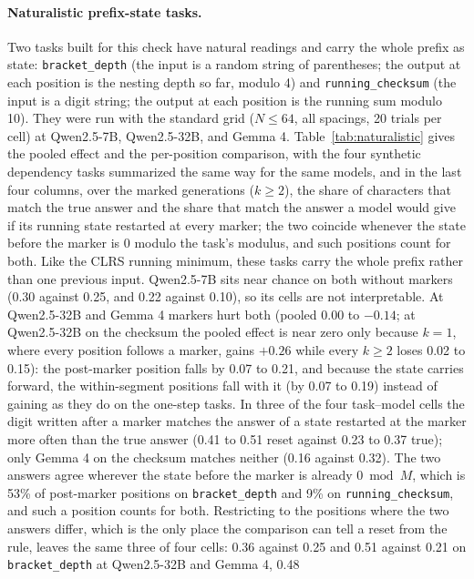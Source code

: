 \documentclass[10pt]{article} %
\newcommand{\task}[1]{\texttt{#1}}
\begin{document}
\begin{table}[!htbp]
\centering
\small
\caption{Gemini 3.6 Flash: prompt tokens added per added input character, from the API's token counts, by input format and marker spacing $k$, at the step from $N = 32$ to $N = 64$, with each marker counted as one token (exact in the spaced, digit, and binary formats, where the count at spacing $k$ exceeds the no-marker count by the number of markers at every $N$). A value of 1.00 is one token per character.}
\label{tab:geminitokens}

\end{table}

\paragraph{Naturalistic prefix-state tasks.} Two tasks built for this check have natural readings and carry the whole prefix as state: \task{bracket\_depth} (the input is a random string of parentheses; the output at each position is the nesting depth so far, modulo 4) and \task{running\_checksum} (the input is a digit string; the output at each position is the running sum modulo 10). They were run with the standard grid ($N \le 64$, all spacings, 20 trials per cell) at Qwen2.5-7B, Qwen2.5-32B, and Gemma 4. Table~\ref{tab:naturalistic} gives the pooled effect and the per-position comparison, with the four synthetic dependency tasks summarized the same way for the same models, and in the last four columns, over the marked generations ($k \ge 2$), the share of characters that match the true answer and the share that match the answer a model would give if its running state restarted at every marker; the two coincide whenever the state before the marker is 0 modulo the task's modulus, and such positions count for both. Like the CLRS running minimum, these tasks carry the whole prefix rather than one previous input. Qwen2.5-7B sits near chance on both without markers (0.30 against 0.25, and 0.22 against 0.10), so its cells are not interpretable. At Qwen2.5-32B and Gemma 4 markers hurt both (pooled 0.00 to $-0.14$; at Qwen2.5-32B on the checksum the pooled effect is near zero only because $k = 1$, where every position follows a marker, gains $+0.26$ while every $k \ge 2$ loses 0.02 to 0.15): the post-marker position falls by 0.07 to 0.21, and because the state carries forward, the within-segment positions fall with it (by 0.07 to 0.19) instead of gaining as they do on the one-step tasks. In three of the four task--model cells the digit written after a marker matches the answer of a state restarted at the marker more often than the true answer (0.41 to 0.51 reset against 0.23 to 0.37 true); only Gemma 4 on the checksum matches neither (0.16 against 0.32). The two answers agree wherever the state before the marker is already $0 \bmod M$, which is 53\% of post-marker positions on \task{bracket\_depth} and 9\% on \task{running\_checksum}, and such a position counts for both. Restricting to the positions where the two answers differ, which is the only place the comparison can tell a reset from the rule, leaves the same three of four cells: 0.36 against 0.25 and 0.51 against 0.21 on \task{bracket\_depth} at Qwen2.5-32B and Gemma 4, 0.48 
\end{document}
